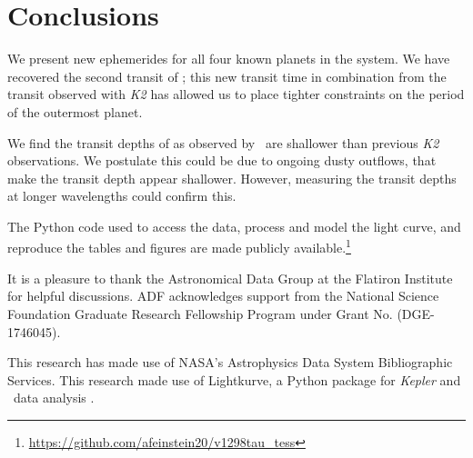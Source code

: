 \documentclass[twocolumn]{aastex631}
\begin{document}
\section{Conclusions} \label{sec:conclusions}

We present new ephemerides for all four known planets in the \sname system. We have recovered the second transit of \planete; this new transit time in combination from the transit observed with \textit{K2} has allowed us to place tighter constraints on the period of the outermost planet.

We find the transit depths of \allplanets as observed by \tess\ are shallower than previous \textit{K2} observations. We postulate this could be due to ongoing dusty outflows, that make the transit depth appear shallower. However, measuring the transit depths at longer wavelengths could confirm this.


The Python code used to access the data, process and model the light curve, and reproduce the tables and figures are made publicly available.\footnote{\url{https://github.com/afeinstein20/v1298tau_tess}}


\begin{acknowledgments}
It is a pleasure to thank the Astronomical Data Group at the Flatiron Institute for helpful discussions. ADF acknowledges support from the National Science Foundation Graduate Research Fellowship Program under Grant No. (DGE-1746045).

This research has made use of NASA's Astrophysics Data System Bibliographic Services. This research made use of Lightkurve, a Python package for \textit{Kepler} and \tess\ data analysis \citep{lightkurve}.

\end{acknowledgments}
\end{document}

